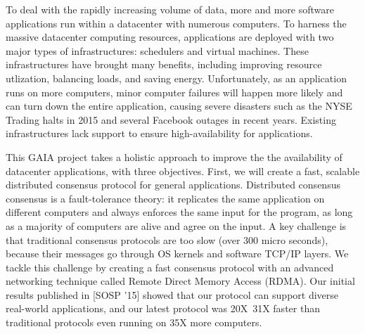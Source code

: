 
{}

To deal with the rapidly increasing volume of data, more and more software
applications run within a datacenter with numerous computers. To harness the 
massive datacenter computing resources, applications are deployed with two major 
types of infrastructures: schedulers and virtual machines. These 
infrastructures have brought many benefits, including improving resource 
utlization, balancing loads, and saving energy. Unfortunately, as an application 
runs on more computers, minor computer failures will happen more likely and can 
turn down the entire application, causing severe disasters such as the NYSE 
Trading halts in 2015 and several Facebook outages in recent years. Existing 
infrastructures lack support to ensure high-availability for applications.

This GAIA project takes a holistic approach to improve the the availability of 
datacenter applications, with three objectives. First, we will create a fast, 
scalable distributed consensus protocol for general applications. Distributed 
consensus consensus is a fault-tolerance theory: it replicates the same 
application on different computers and always enforces the same input for the 
program, as long as a majority of computers are alive and agree on the input. A 
key challenge is that traditional consensus protocols are too slow (over 300 
micro seconds), because their messages go through OS kernels and software 
TCP/IP layers. We tackle this challenge by creating a fast consensus protocol 
with an advanced networking technique called Remote Direct Memory Access 
(RDMA). Our initial results published in [SOSP '15] showed that our protocol 
can support diverse real-world applications, and our latest protocol was 
20X~31X faster than traditional protocols even running on 35X more computers.



